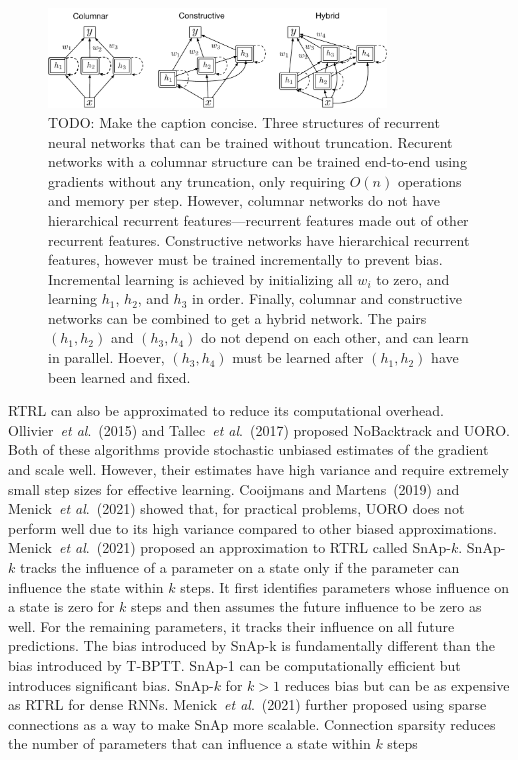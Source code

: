 \documentclass{article}
\newcommand{\etal}{\textit{et al}.}
\begin{document}
\begin{figure}
	\centering
	\includegraphics[width=0.8\textwidth]{figures/three_types}
	\caption{TODO: Make the caption concise. Three structures of recurrent neural networks that can be trained without truncation. Recurent networks with a columnar structure can be trained end-to-end using gradients without any truncation, only requiring $O(n)$ operations and memory per step. However, columnar networks do not have hierarchical recurrent features---recurrent features made out of other recurrent features. Constructive networks have hierarchical recurrent features, however must be trained incrementally to prevent bias. Incremental learning is achieved by initializing all $w_i$ to zero, and learning $h_1$, $h_2$, and $h_3$ in order. Finally, columnar and constructive networks can be combined to get a hybrid network. The pairs $(h_1, h_2)$ and $(h_3, h_4)$ do not depend on each other, and can learn in parallel. Hoever, $(h_3, h_4)$ must be learned after $(h_1, h_2)$ have been learned and fixed.}
\end{figure}

RTRL can also be approximated to reduce its computational overhead. Ollivier~\etal~(2015) and Tallec~\etal~(2017) proposed NoBacktrack and UORO. Both of these algorithms provide stochastic unbiased estimates of the gradient and scale well. However, their estimates have high variance and require extremely small step sizes for effective learning. Cooijmans and Martens~(2019) and Menick~\etal~(2021) showed that, for practical problems, UORO does not perform well due to its high variance compared to other biased approximations. Menick~\etal~(2021) proposed an approximation to RTRL called SnAp-$k$. SnAp-$k$ tracks the influence of a parameter on a state only if the parameter can influence the state within $k$ steps. It first identifies parameters whose influence on a state is zero for $k$ steps and then assumes the future influence to be zero as well. For the remaining parameters, it tracks their influence on all future predictions. The bias introduced by SnAp-k is fundamentally different than the bias introduced by T-BPTT. SnAp-1 can be computationally efficient but introduces significant bias. SnAp-$k$ for $k>1$ reduces bias but can be as expensive as RTRL for dense RNNs.  Menick~\etal~(2021) further proposed using sparse connections as a way to make SnAp more scalable. Connection sparsity reduces the number of parameters that can influence a state within $k$ steps
\end{document}
